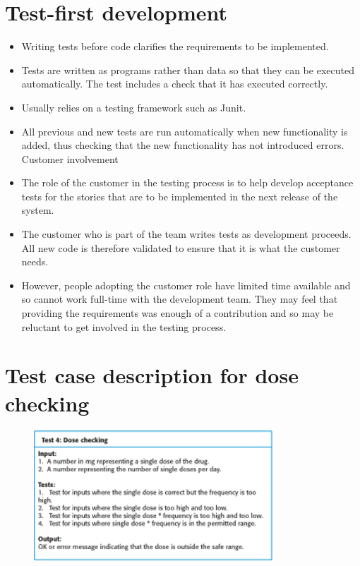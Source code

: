 \section{ Test-first development}
\begin{itemize}

\item Writing tests before code clarifies the requirements to be implemented.

\item Tests are written as programs rather than data so that they can be executed automatically. The test includes a check that it has executed correctly.

\item Usually relies on a testing framework such as Junit.

\item All previous and new tests are run automatically when new functionality is added, thus checking that the new functionality has not introduced errors.
Customer involvement
\item The role of the customer in the testing process is to help develop acceptance tests for the stories that are to be implemented in the next release of the system.

\item The customer who is part of the team writes tests as development proceeds. All new code is therefore validated to ensure that it is what the customer needs.

\item However, people adopting the customer role have limited time available and so cannot work full-time with the development team. They may feel that providing the requirements was enough of a contribution and so may be reluctant to get involved in the testing process.


\end{itemize}
\newpage
\section{ Test case description for dose checking}
\begin{figure}[h!]
    \centering
    \includegraphics[width = 0.8\textwidth]{./figures/L2_6.png}
    \caption{}
    \label{fig:L2_6}
\end{figure}

